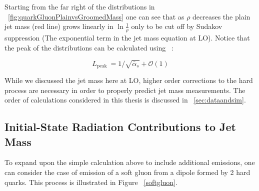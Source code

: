  Starting from the far right of the distributions in ~\ref{fig:quarkGluonPlainvsGroomedMass} one can see that as $\rho$ decreases the plain jet mass (red line) grows linearly in $\ln \frac{1}{\rho}$ only to be cut off by Sudakov suppression (The exponential term in the jet mass equation at LO). Notice that the peak of the distributions can be calculated using ~\cite{mmdt}:\newline

\begin{equation}
L_{\text {peak }}=1 / \sqrt{\bar{\alpha}_{s}}+\mathcal{O}(1)
\end{equation}
 




While we discussed the jet mass here at LO, higher order corrections to the hard process are necessary in order to properly predict jet mass measurements. The order of calculations considered in this thesis is discussed in ~\ref{sec:dataandsim}.









\subsection{Initial-State Radiation Contributions to Jet Mass }\label{sec:jetmassISR}


To expand upon the simple calculation above to include additional emissions, one can consider the case of emission of a soft gluon from a dipole formed by 2 hard quarks. This process is illustrated in Figure ~\ref{softgluon}.



